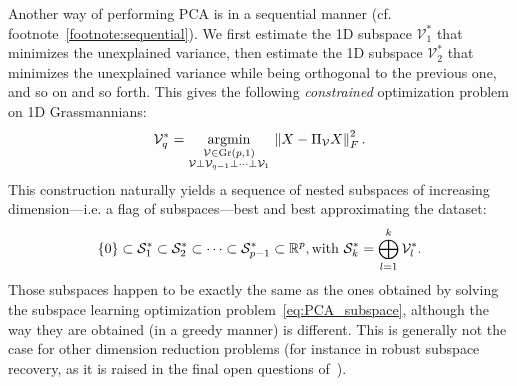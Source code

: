 Another way of performing PCA is in a sequential manner (cf. footnote~\ref{footnote:sequential}). We first estimate the 1D subspace $\mathcal{V}_1^*$ that minimizes the unexplained variance, then estimate the 1D subspace $\mathcal{V}_2^*$ that minimizes the unexplained variance while being orthogonal to the previous one, and so on and so forth. This gives the following \textit{constrained} optimization problem on 1D Grassmannians:
\begin{equation}\label{eq:PCA_sequential}
\mathcal{V}_q^* = \underset{\substack{\mathcal{V} \in \operatorname{Gr}(p, 1)\\ \mathcal{V} \perp \mathcal{V}_{q-1} \perp \dots \perp \mathcal{V}_1}}{\operatorname{argmin}} \, \left\lVert X - \Pi_{\mathcal{V}} X\right\rVert_F^2.
\end{equation}
This construction naturally yields a sequence of nested subspaces of increasing dimension---i.e. a flag of subspaces---best and best approximating the dataset:
\begin{equation}
	\{0\} \subset \mathcal{S}_1^* \subset \mathcal{S}_2^* \subset \dots \subset \mathcal{S}_{p-1}^* \subset \mathbb{R}^p, \text{with } \mathcal{S}_k^* = \bigoplus_{l=1}^k \mathcal{V}_l^*.
\end{equation}
Those subspaces happen to be exactly the same as the ones obtained by solving the subspace learning optimization problem~\eqref{eq:PCA_subspace}, although the way they are obtained (in a greedy manner) is different. This is generally not the case for other dimension reduction problems (for instance in robust subspace recovery, as it is raised in the final open questions of~\citet{lerman_overview_2018}).

